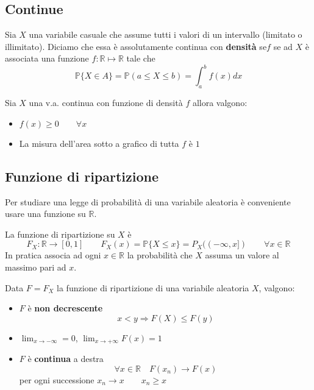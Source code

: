\subsection{Continue}
\begin{definition}
	Sia $X$ una variabile casuale che assume tutti i valori di un intervallo (limitato o illimitato). Diciamo che essa è assolutamente continua con \textbf{densità} se$f$ se ad $X$ è associata una funzione $f:\mathbb{R} \mapsto \mathbb{R}$ tale che
	\begin{equation}
		\mathbb{P}\{X \in A\}=\mathbb{P}(a \leq X \leq b) = \int_{a}^{b} f(x) dx
	\end{equation}
\end{definition}

\begin{proposition}[Proprietà]
	Sia $X$ una v.a. continua con funzione di densità $f$ allora valgono:
	\begin{itemize}
		\item $f(x)\geq 0 \qquad \forall x$
		\item La misura dell'area sotto a grafico di tutta $f$ è $1$
	\end{itemize}
\end{proposition}

\subsection{Funzione di ripartizione}
Per studiare una legge di probabilità di una variabile aleatoria è conveniente usare una funzione su $\mathbb{R}$.
\begin{definition}
	La funzione di ripartizione su $X$ è
	\begin{equation}
		F_X:\mathbb{R}\to[0,1] \quad\quad F_X(x) = \mathbb{P}\{X \leq x\} = P_X((-\infty,x]) \qquad \forall x \in \mathbb{R}
	\end{equation}
	In pratica associa ad ogni $x \in \mathbb{R}$ la probabilità che $X$ assuma un valore al massimo pari ad $x$.
\end{definition}

\begin{proposition}
	Data $F=F_X$ la funzione di ripartizione di una variabile aleatoria $X$, valgono:
	\begin{itemize}
		\item $F$ è \textbf{non decrescente}
		\begin{equation}
			x < y \Longrightarrow F(X) \leq F(y)
		\end{equation}
		\item $\lim_{x \to -\infty}=0$, $\lim_{x \to + \infty}F(x) = 1$
		\item $F$ è \textbf{continua} a destra
		\begin{equation}
			\forall x \in \mathbb{R} \quad F(x_n) \to F(x)
		\end{equation}
		per ogni successione $x_n \to x \quad\quad x_n \geq x$
	\end{itemize}
\end{proposition}

